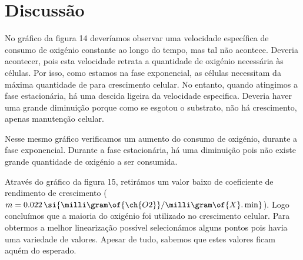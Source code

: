 \documentclass[\mainfilename]{subfiles}
\begin{document}
\begin{sectionBox}
\begin{center}
    \end{center}
    
    \section*{Discussão}
    No gráfico da figura 14 deveríamos observar uma velocidade específica de consumo de oxigénio constante ao longo do tempo, mas tal não acontece. Deveria acontecer, pois esta velocidade retrata a quantidade de oxigénio necessária às células. Por isso, como estamos na fase exponencial, as células necessitam da máxima quantidade de  para crescimento celular. No entanto, quando atingimos a fase estacionária, há uma descida ligeira da velocidade especifica. Deveria haver uma grande diminuição porque como se esgotou o substrato, não há crescimento, apenas manutenção celular.\par
    Nesse mesmo gráfico verificamos um aumento do consumo de oxigénio, durante a fase exponencial. Durante a fase estacionária, há uma diminuição pois não existe grande quantidade de oxigénio a ser consumida.\par
    Através do gráfico da figura 15, retirámos um valor baixo de coeficiente de rendimento de crescimento (\(m= 0.022\,\si{\milli\gram\of{\ch{O2}}/\milli\gram\of{X}.\min}\)). Logo concluímos que a maioria do oxigénio foi utilizado no crescimento celular. Para obtermos a melhor linearização possível selecionámos alguns pontos pois havia uma variedade de valores. Apesar de tudo, sabemos que estes valores ficam aquém do esperado.

\end{sectionBox}
\end{document}
